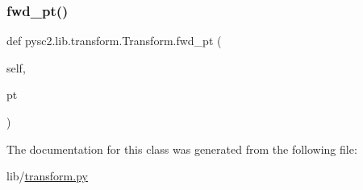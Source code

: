 \mbox{\label{classpysc2_1_1lib_1_1transform_1_1_transform_a0df7bdb41fe83c2f8e16f98a5690f0ba}} 
\subsubsection{\texorpdfstring{fwd\+\_\+pt()}{fwd\_pt()}}
{\footnotesize\ttfamily def pysc2.\+lib.\+transform.\+Transform.\+fwd\+\_\+pt (\begin{DoxyParamCaption}\item[{}]{self,  }\item[{}]{pt }\end{DoxyParamCaption})}



The documentation for this class was generated from the following file\+:\begin{DoxyCompactItemize}
\item 
lib/\mbox{\hyperlink{transform_8py}{transform.\+py}}\end{DoxyCompactItemize}
